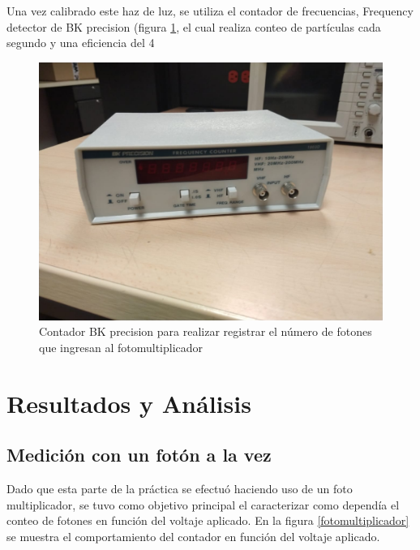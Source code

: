 \documentclass[%
 reprint,
 amsmath,amssymb,
 aps,
]{revtex4-1}
\begin{document}
Una vez calibrado este haz de luz, se utiliza el contador de frecuencias, Frequency detector de BK precision (figura \ref{contador}, el cual realiza conteo de partículas cada segundo y una eficiencia del 4{%

\begin{figure}
    \centering
    \includegraphics[scale=0.1]{Double_Slit/Figuras/Contador.jpg}
    \caption{Contador BK precision para realizar registrar el número de fotones que ingresan al fotomultiplicador}
    \label{contador}
\end{figure}

\section{Resultados y Análisis}
\subsection{}
\subsection{Medición con un fotón a la vez}
Dado que esta parte de la práctica se efectuó haciendo uso de un foto multiplicador, se tuvo como objetivo principal el caracterizar como dependía el conteo de fotones en función del voltaje aplicado. En la figura \ref{fotomultiplicador} se muestra el comportamiento del contador en función del voltaje aplicado.

}
\end{document}
